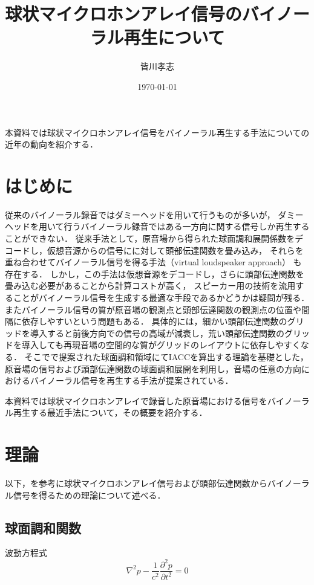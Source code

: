 \documentclass[a4paper]{jsarticle}
\begin{document}
\title{球状マイクロホンアレイ信号のバイノーラル再生について}
\author{皆川孝志}
\date{\today}
\maketitle

本資料では球状マイクロホンアレイ信号をバイノーラル再生する手法についての近年の動向を紹介する．

\section{はじめに}
従来のバイノーラル録音ではダミーヘッドを用いて行うものが多いが，
ダミーヘッドを用いて行うバイノーラル録音ではある一方向に関する信号しか再生することができない\cite{Andersson_undated-qg}．
従来手法として，原音場から得られた球面調和展開係数をデコードし，仮想音源からの信号にに対して頭部伝達関数を畳み込み，
それらを重ね合わせてバイノーラル信号を得る手法\cite{Jot1999-bt, Noisternig2003-ug}（virtual loudspeaker approach）
も存在する．
しかし，この手法は仮想音源をデコードし，さらに頭部伝達関数を畳み込む必要があることから計算コストが高く，
スピーカー用の技術を流用することがバイノーラル信号を生成する最適な手段であるかどうかは疑問が残る\cite{Schorkhuber2018-ql}．
またバイノーラル信号の質が原音場の観測点と頭部伝達関数の観測点の位置や間隔に依存しやすいという問題もある．
具体的には，細かい頭部伝達関数のグリッドを導入すると前後方向での信号の高域が減衰し，荒い頭部伝達関数のグリッドを導入しても再現音場の空間的な質がグリッドのレイアウトに依存しやすくなる\cite{Zotter2019-ix}．
そこで\cite{Rafaely2010-ea}で提案された球面調和領域にてIACCを算出する理論を基礎とした，原音場の信号および頭部伝達関数の球面調和展開を利用し，音場の任意の方向におけるバイノーラル信号を再生する手法が提案されている\cite{Andersson_undated-qg, Ben-Hur2017-gm, Bernschutz2016-be,Otani2020-cg,Schorkhuber2018-ql, Sheaffer2014-bo, Zaunschirm2018-mn}．

本資料では球状マイクロホンアレイで録音した原音場における信号をバイノーラル再生する最近手法について，その概要を紹介する．

\section{理論}
以下，\cite{Andersson_undated-qg}を参考に球状マイクロホンアレイ信号および頭部伝達関数からバイノーラル信号を得るための理論について述べる．

\subsection{球面調和関数}
波動方程式
\begin{equation}
    \label{wave-equation}
    \nabla^{2} p-\frac{1}{c^{2}} \frac{\partial^{2} p}{\partial t^{2}}=0
\end{equation}
\end{document}
